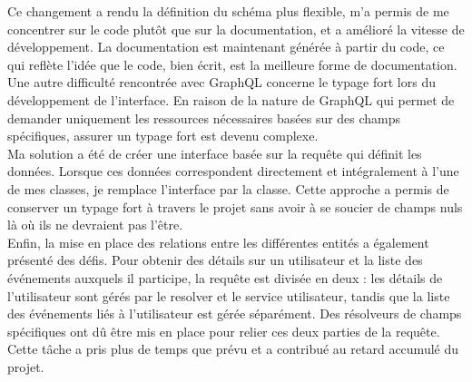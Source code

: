 Ce changement a rendu la définition du schéma plus flexible, m'a permis de me concentrer sur le code plutôt que sur la documentation, et a amélioré la vitesse de développement.
La documentation est maintenant générée à partir du code, ce qui reflète l'idée que le code, bien écrit, est la meilleure forme de documentation.\\

Une autre difficulté rencontrée avec GraphQL concerne le typage fort lors du développement de l'interface.
En raison de la nature de GraphQL qui permet de demander uniquement les ressources nécessaires basées sur des champs spécifiques, assurer un typage fort est devenu complexe.\\

Ma solution a été de créer une interface basée sur la requête qui définit les données.
Lorsque ces données correspondent directement et intégralement à l'une de mes classes, je remplace l'interface par la classe.
Cette approche a permis de conserver un typage fort à travers le projet sans avoir à se soucier de champs nuls là où ils ne devraient pas l'être.\\

Enfin, la mise en place des relations entre les différentes entités a également présenté des défis.
Pour obtenir des détails sur un utilisateur et la liste des événements auxquels il participe, la requête est divisée en deux :
les détails de l'utilisateur sont gérés par le resolver et le service utilisateur, tandis que la liste des événements liés à l'utilisateur est gérée séparément.
Des résolveurs de champs spécifiques ont dû être mis en place pour relier ces deux parties de la requête.
Cette tâche a pris plus de temps que prévu et a contribué au retard accumulé du projet.